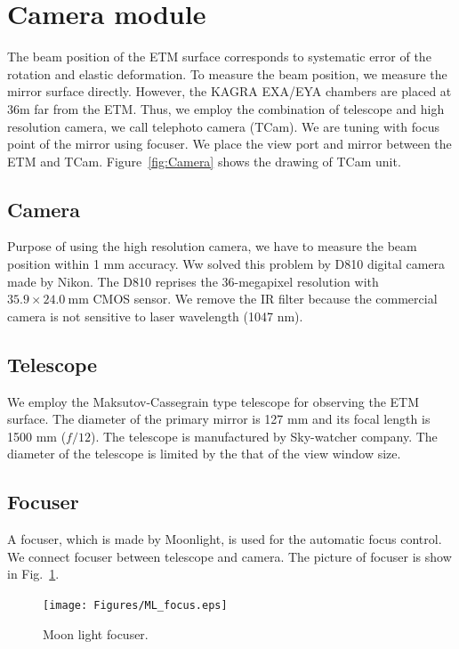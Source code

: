
\section{Camera module} \label{Tcam_inst}
The beam position of the ETM surface corresponds to systematic error of the rotation and elastic deformation. To measure the beam position, we measure the mirror surface directly. However, the KAGRA EXA/EYA chambers are placed at 36m far from the ETM. Thus, we employ the combination of telescope and high resolution camera, we call telephoto camera (TCam). We are tuning with focus point of the mirror using focuser.  We place the view port and mirror between the ETM and TCam. Figure~\ref{fig:Camera} shows the drawing of TCam unit.
\subsection{Camera}
Purpose of using the high resolution camera, we have to measure the beam position within 1 mm accuracy. Ww solved this problem by D810 digital camera made by Nikon. The D810 reprises the 36-megapixel resolution with $35.9 \times 24.0~\mathrm{mm}$ CMOS sensor. We remove the IR filter because the commercial camera is not sensitive to laser wavelength (1047 nm).
\subsection{Telescope}
We employ the Maksutov-Cassegrain type telescope for observing the ETM surface. The diameter of the primary mirror is 127 mm and its focal length is 1500 mm ($f/12$). The telescope is manufactured by Sky-watcher company. The diameter of the telescope is limited by the that of the view window size. 
\subsection{Focuser}
A focuser, which is made by Moonlight, is used for the automatic focus control. 
We connect focuser between telescope and camera. 
The picture of focuser is show in Fig.~\ref{fig:ML_focus}.

\begin{figure}
\begin{center}
\texttt{[image: Figures/ML\_focus.eps]}
\caption{Moon light focuser.}
\label{fig:ML_focus} 
\end{center}
\end{figure}


